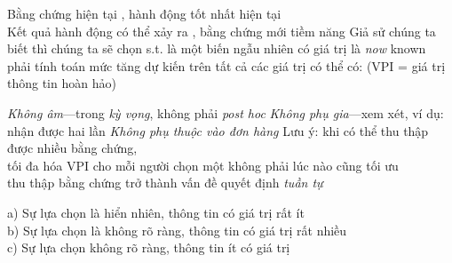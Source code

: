 \documentclass{article}
\begin{document}
\begin{huge}
Bằng chứng hiện tại , hành động tốt nhất hiện tại \mat{$\alpha$} \\
Kết quả hành động có thể xảy ra , bằng chứng mới tiềm năng 
\mat{\[
  EU(\alpha|E) = \max_{a} \mysum_i\ U(S_i)\;P(S_i|E,a)
\]}
Giả sử chúng ta biết  thì chúng ta sẽ chọn  s.t.
\mat{\[
  EU(\alpha_{e_{jk}}|E,E_j \eq e_{jk}) = \max_a \mysum_i\ U(S_i)\;P(S_i|E,a,E_j \eq e_{jk})
\]}
 là một biến ngẫu nhiên có giá trị là {\it now} known\\
\mat{$\implies$} phải tính toán mức tăng dự kiến trên tất cả các giá trị có thể có:
\mat{\[
VPI_{E}(E_j) = \left(\mysum_k\ P(E_j \eq e_{jk}|E)
EU(\alpha_{e_{jk}}|E,E_j \eq e_{jk})\right) - EU(\alpha|E) 
\]}
(VPI = giá trị thông tin hoàn hảo)



\emph{Không âm}---trong \emph{kỳ vọng}, không phải \emph{post hoc}
\emph{Không phụ gia}---xem xét, ví dụ: nhận được  hai lần
\mat{\[
VPI_{E}(E_j,E_k) \not= VPI_{E}(E_j) + VPI_{E}(E_k)
\]}
\emph{Không phụ thuộc vào đơn hàng}
\mat{\[
VPI_{E}(E_j,E_k) = VPI_{E}(E_j) + VPI_{E,E_j}(E_k)
                   = VPI_{E}(E_k) + VPI_{E,E_k}(E_j) 
\]}
Lưu ý: khi có thể thu thập được nhiều bằng chứng,\\
tối đa hóa VPI cho mỗi người chọn một không phải lúc nào cũng tối ưu\\
\mat{$\implies$} thu thập bằng chứng trở thành vấn đề quyết định \emph{tuần tự}



\heading{Hành vi định tính}

a) Sự lựa chọn là hiển nhiên, thông tin có giá trị rất ít\\
b) Sự lựa chọn là không rõ ràng, thông tin có giá trị rất nhiều\\
c) Sự lựa chọn không rõ ràng, thông tin ít có giá trị

\vspace*{-0.2in} %

\textwidth
{}





\end{huge} 
\end{document}
